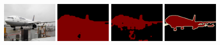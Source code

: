 \begin{figure}[tbhp!]
  \centering
  
  \hspace{4em}
  \hspace{1.5em}
  \hspace{1.5em}
  \vspace{-0.05em}
  \vspace{-0.05em}

  {\includegraphics[width=0.24\textwidth]{Images/0000.jpg}}
  {\includegraphics[width=0.24\textwidth]{figures/experiments/pascal/orgckpt/0000.png}}
  {\includegraphics[width=0.24\textwidth]{figures/experiments/pascal/nonnoisybaseline/0000.png}}
  {\includegraphics[width=0.24\textwidth]{figures/experiments/pascal/gt/2007_000033.png}}


\end{figure}
